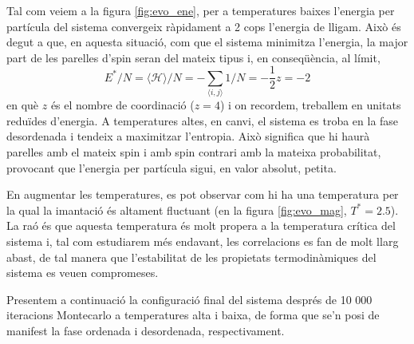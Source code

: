 \documentclass[a4paper]{article}
\begin{document}
Tal com veiem a la figura \ref{fig:evo_ene}, per a temperatures baixes l'energia per partícula del sistema convergeix ràpidament a 2 cops l'energia de lligam. Això és degut a que, en aquesta situació, com que el sistema minimitza l'energia, la major part de les parelles d'spin seran del mateix tipus i, en conseqüència, al límit,
\begin{equation*}
    E^*/N = \langle \mathcal{H} \rangle / N= -\sum_{\langle{i,j\rangle}} 1/N = -\frac{1}{2}z = -2
\end{equation*}
en què $z$ és el nombre de coordinació ($z=4$) i on recordem, treballem en unitats reduïdes d'energia. A temperatures altes, en canvi, el sistema es troba en la fase desordenada i tendeix a maximitzar l'entropia. Això significa que hi haurà parelles amb el mateix spin i amb spin contrari amb la mateixa probabilitat, provocant que l'energia per partícula sigui, en valor absolut, petita.

En augmentar les temperatures, es pot observar com hi ha una temperatura per la qual la imantació és altament fluctuant (en la figura \ref{fig:evo_mag}, $T^*=2.5$). La raó és que aquesta temperatura és molt propera a la temperatura crítica del sistema i, tal com estudiarem més endavant, les correlacions es fan de molt llarg abast, de tal manera que l'estabilitat de les propietats termodinàmiques del sistema es veuen compromeses.

Presentem a continuació la configuració final del sistema després de 10 000 iteracions Montecarlo a temperatures alta i baixa, de forma que se'n posi de manifest la fase ordenada i desordenada, respectivament.
\end{document}
